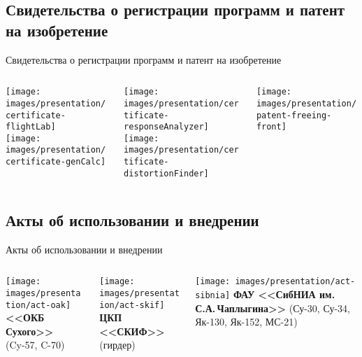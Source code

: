 \subsection{Свидетельства о регистрации программ и патент на изобретение}

\begin{frame}{Свидетельства о регистрации программ и патент на изобретение}
	\begin{center}
		\begin{columns}
			\begin{column}{0.24\textwidth}
				\centering
				\texttt{[image: images/presentation/certificate-flightLab]} \\ \vspace{0.5em}
				\texttt{[image: images/presentation/certificate-genCalc]}
			\end{column}
			\begin{column}{0.24\textwidth}
				\centering
				\texttt{[image: images/presentation/certificate-responseAnalyzer]} \\ \vspace{0.5em}
				\texttt{[image: images/presentation/certificate-distortionFinder]}
			\end{column}
			\begin{column}{0.3\textwidth}
				\centering
				\texttt{[image: images/presentation/patent-freeing-front]}
			\end{column}
		\end{columns}
	\end{center}
\end{frame}

\subsection{Акты об использовании и внедрении}

\begin{frame}{Акты об использовании и внедрении}
	\begin{center}
		\begin{columns}
			\begin{column}{0.34\textwidth}
				\centering
				\texttt{[image: images/presentation/act-oak]}
				\textbf{<<ОКБ Сухого>>} \\ (Cy-57, C-70)
			\end{column}
			\begin{column}{0.34\textwidth}
				\centering
				\texttt{[image: images/presentation/act-skif]}
				\textbf{ЦКП <<СКИФ>>} \\ (гирдер)
			\end{column}
			\begin{column}{0.34\textwidth}
				\centering
				\vspace{2.5em}
				\texttt{[image: images/presentation/act-sibnia]}
				\textbf{ФАУ <<СибНИА им.\,С.А.\,Чаплыгина>>} (Су-30, Су-34, Як-130, Як-152, МС-21)
			\end{column}
		\end{columns}
	\end{center}	
\end{frame}
